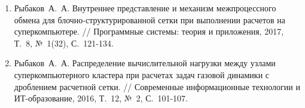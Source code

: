 \documentclass[a4paper,14pt]{extarticle}                     %
\theoremstyle{plain}                                         %
\begin{document}
\begin{enumerate}[noitemsep,topsep=0pt,parsep=0pt,partopsep=0pt]
\item Рыбаков~А.~А. Внутреннее представление и механизм межпроцессного обмена для блочно-структурированной сетки при выполнении расчетов на суперкомпьютере. // Программные системы: теория и приложения, 2017, Т.~8, №~1(32), С.~121-134.
\item Рыбаков~А.~А. Распределение вычислительной нагрузки между узлами суперкомпьютерного кластера при расчетах задач газовой динамики с дроблением расчетной сетки. // Современные информационные технологии и ИТ-образование, 2016, Т.~12, №~2, С.~101-107.
\end{enumerate}

\end{document}
